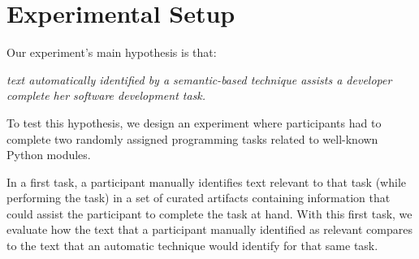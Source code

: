 \clearpage

\section{Experimental Setup}
\label{cp6:procedures}



Our experiment's main hypothesis is that:


\medskip
\begin{bluequote}
    \textit{text automatically identified by a semantic-based technique assists a 
    developer complete her software development task.} 
\end{bluequote}



To test this hypothesis, we design an experiment where  participants
 had to complete two randomly assigned programming tasks related to well-known Python modules. 
 
 


In a first task, a participant manually identifies text relevant to that task (while performing the task)
in a set of curated artifacts containing information that could assist the participant to complete the task at hand.
With this first task, we evaluate how the text that a participant manually identified as relevant
compares to the text that an automatic technique would identify for that same task. 



